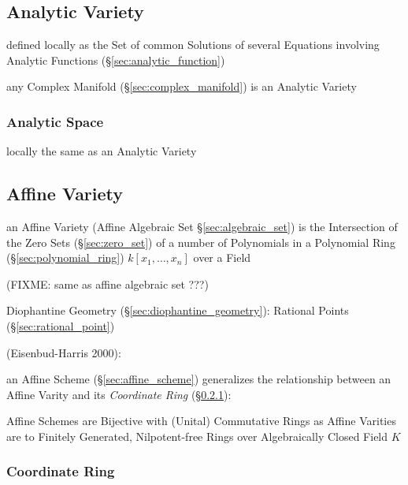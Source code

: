 \subsection{Analytic Variety}\label{sec:analytic_variety}

defined locally as the Set of common Solutions of several Equations involving
Analytic Functions (\S\ref{sec:analytic_function})

any Complex Manifold (\S\ref{sec:complex_manifold}) is an Analytic Variety



\subsubsection{Analytic Space}\label{sec:analytic_space}

locally the same as an Analytic Variety




\subsection{Affine Variety}\label{sec:affine_variety}

an Affine Variety (Affine Algebraic Set \S\ref{sec:algebraic_set}) is the
Intersection of the Zero Sets (\S\ref{sec:zero_set}) of a number of Polynomials
in a Polynomial Ring (\S\ref{sec:polynomial_ring}) $k[x_1,\ldots,x_n]$ over a
Field

(FIXME: same as affine algebraic set ???)

\fist Diophantine Geometry (\S\ref{sec:diophantine_geometry}): Rational Points
(\S\ref{sec:rational_point})

(Eisenbud-Harris 2000):

\fist an Affine Scheme (\S\ref{sec:affine_scheme}) generalizes the relationship
between an Affine Varity and its \emph{Coordinate Ring}
(\S\ref{sec:coordinate_ring}):

Affine Schemes are Bijective with (Unital) Commutative Rings as Affine Varities
are to Finitely Generated, Nilpotent-free Rings over Algebraically Closed Field
$K$



\subsubsection{Coordinate Ring}\label{sec:coordinate_ring}

